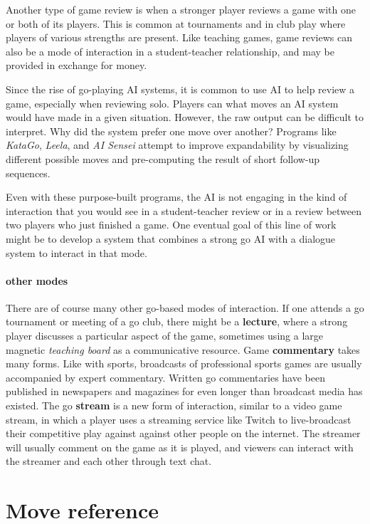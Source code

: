\documentclass{scrartcl}
\begin{document}
Another type of game review is when a stronger player 
reviews a game with one or both of its players. 
This is common at tournaments and in club play where 
players of various strengths are present.
Like teaching games, game reviews can also be a mode
of interaction in a student-teacher relationship,
and may be provided in exchange for money.

Since the rise of go-playing AI systems, 
it is common to use AI to help review a game,
especially when reviewing solo.
Players can what moves an AI system would have made in a given situation.
However, the raw output can be difficult to interpret.
Why did the system prefer one move over another?
Programs like \textit{KataGo}, \textit{Leela}, and \textit{AI Sensei}
attempt to improve expandability by visualizing different
possible moves and pre-computing the result of short 
follow-up sequences.

Even with these purpose-built programs,
the AI is not engaging in the kind of   
interaction that you would see in a student-teacher
review or in a review between two players who just finished a game.
One eventual goal of this line of work might be to develop
a system that combines a strong go AI with a dialogue system
to interact in that mode.

\paragraph{other modes} There are of course many other
go-based modes of interaction.
If one attends a go tournament or meeting of a go club,
there might be a \textbf{lecture}, 
where a strong player discusses a particular aspect of the game,
sometimes using a large magnetic \emph{teaching board} 
as a communicative resource.
Game \textbf{commentary} takes many forms.
Like with sports, broadcasts of professional sports games
are usually accompanied by expert commentary.
Written go commentaries have been published in newspapers
and magazines for even longer than broadcast media has existed.
The go \textbf{stream} is a new form of interaction,
similar to a video game stream,
in which a player uses a streaming service like Twitch to live-broadcast 
their competitive play against against other people on the internet.
The streamer will usually comment on the game as it is played,
and viewers can interact with the streamer and each other through text chat.

\section{Move reference}
\end{document}
